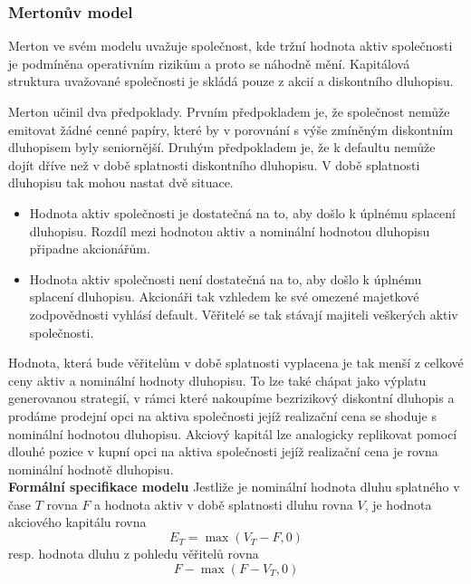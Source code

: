 \documentclass[a4paper]{book}
\begin{document}
\subsubsection{Mertonův model}

Merton ve svém modelu uvažuje společnost, kde tržní hodnota aktiv společnosti je podmíněna operativním rizikům a proto se náhodně mění. Kapitálová struktura uvažované společnosti je skládá pouze z akcií a diskontního dluhopisu.

Merton učinil dva předpoklady. Prvním předpokladem je, že společnost nemůže emitovat žádné cenné papíry, které by v porovnání s výše zmíněným diskontním dluhopisem byly seniornější. Druhým předpokladem je, že k defaultu nemůže dojít dříve než v době splatnosti diskontního dluhopisu. V době splatnosti dluhopisu tak mohou nastat dvě situace.
\begin{itemize}
\item Hodnota aktiv společnosti je dostatečná na to, aby došlo k úplnému splacení dluhopisu. Rozdíl mezi hodnotou aktiv a nominální hodnotou dluhopisu připadne akcionářům.
\item Hodnota aktiv společnosti není dostatečná na to, aby došlo k úplnému splacení dluhopisu. Akcionáři tak vzhledem ke své omezené majetkové zodpovědnosti vyhlásí default. Věřitelé se tak stávají majiteli veškerých aktiv společnosti.
\end{itemize}
Hodnota, která bude věřitelům v době splatnosti vyplacena je tak menší z celkové ceny aktiv a nominální hodnoty dluhopisu. To lze také chápat jako výplatu generovanou strategií, v rámci které nakoupíme bezrizikový diskontní dluhopis a prodáme prodejní opci na aktiva společnosti jejíž realizační cena se shoduje s nominální hodnotou dluhopisu. Akciový kapitál lze analogicky replikovat pomocí dlouhé pozice v kupní opci na aktiva společnosti jejíž realizační cena je rovna nominální hodnotě dluhopisu.\\

\noindent \textbf{Formální specifikace modelu} Jestliže je nominální hodnota dluhu splatného v čase $T$ rovna $F$ a hodnota aktiv v době splatnosti dluhu rovna $V$, je hodnota akciového kapitálu rovna
\begin{equation*}
E_T = \max(V_T - F, 0)
\end{equation*}
resp. hodnota dluhu z pohledu věřitelů rovna
\begin{equation*}
F - \max(F - V_T,0)
\end{equation*}
\end{document}

